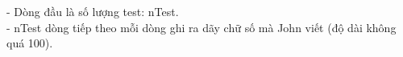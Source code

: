 - Dòng đầu là số lượng test: nTest.
\\- nTest dòng tiếp theo mỗi dòng ghi ra dãy chữ số mà John viết (độ dài không quá 100).

\